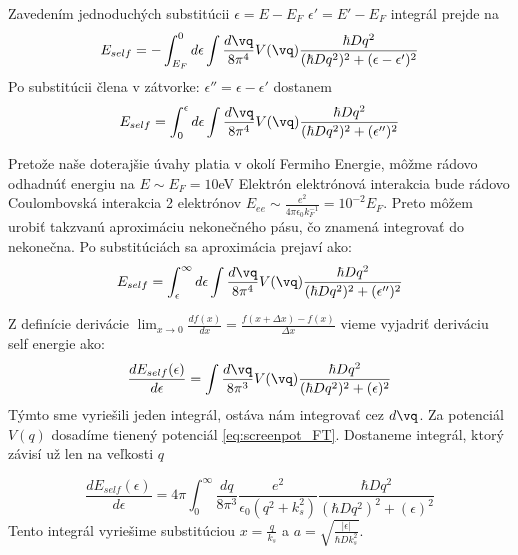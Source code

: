 Zavedením jednoduchých substitúcii $\epsilon=E-E_F$ $\epsilon'=E'-E_F$ integrál prejde na
\begin{equation}
\label{aa_selfenergy_subst1}
E_{self}=-\int_{E_F}^{0}d\epsilon \int \frac{d\vq}{8\pi^4}V(\vq)\frac{\hbar D q^2}{(\hbar Dq^2)^2+(\epsilon-\epsilon')^2}
\end{equation}
Po substitúcii člena v zátvorke:
$\epsilon''=\epsilon-\epsilon'$ dostanem
\begin{equation}
\label{eq:aa_selfenergy_subst_2}
E_{self}=\int_{0}^{\epsilon}d\epsilon \int \frac{d\vq}{8\pi^4}V(\vq)\frac{\hbar D q^2}{(\hbar Dq^2)^2+(\epsilon'')^2}
\end{equation}

Pretože naše doterajšie úvahy platia v okolí Fermiho Energie, môžme rádovo odhadnúť energiu na  $E \sim E_F=10$eV
Elektrón elektrónová interakcia bude rádovo Coulombovská interakcia 2 elektrónov $E_{ee}\sim \frac{e^2}{4\pi\epsilon_0 k_F^{-1}}=10^{-2}E_F$. Preto môžem urobiť takzvanú aproximáciu nekonečného pásu,
čo znamená integrovať do nekonečna. Po substitúciách sa aproximácia prejaví ako:
\begin{equation}
\label{eq:aa_selfenergy_infinite}
E_{self}=\int_{\epsilon}^{\infty}d\epsilon \int \frac{d\vq}{8\pi^4}V(\vq)\frac{\hbar D q^2}{(\hbar Dq^2)^2+(\epsilon'')^2}
\end{equation}


Z definície derivácie $\lim_{x \to 0}\frac{df(x)}{dx}=\frac{f(x+\Delta x)-f(x)}{\Delta x}$ vieme vyjadriť deriváciu self energie ako:
\begin{equation}
 \label{eq:aa_selfenergy_der}
 \frac{dE_{self}(\epsilon)}{d\epsilon}=\int \frac{d\vq}{8\pi^3}V(\vq)\frac{\hbar D q^2}{(\hbar Dq^2)^2+(\epsilon)^2}
\end{equation}
Týmto sme vyriešili jeden integrál, ostáva nám integrovať cez $d\vq$. Za potenciál $V(q)$ dosadíme tienený potenciál
\eqref{eq:screenpot_FT}. Dostaneme integrál, ktorý závisí už len na veľkosti $q$


\begin{equation}
 \frac{dE_{self}(\epsilon)}{d\epsilon}=4\pi \int_0^\infty \frac{dq}{8\pi^3}\frac{e^2}{\epsilon_0(q^2+k_s^2)}\frac{\hbar D q^2}{(\hbar Dq^2)^2+(\epsilon)^2}
\end{equation}
 Tento integrál vyriešime substitúciou $x=\frac{q}{k_s}$ a $a=\sqrt{\frac{|\epsilon|}{\hbar D k_s^2}}$.

